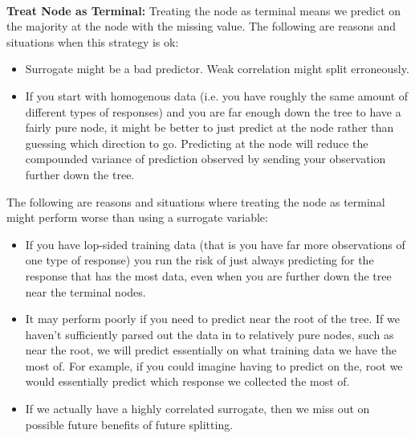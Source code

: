 \documentclass[11pt]{article}
\begin{document}
\begin{center}

\ \\
\end{center}


\vspace{5 mm}
\noindent
{\bf Treat Node as Terminal:} Treating the node as terminal means we predict on 
the majority at the node with the missing value. The following are reasons and 
situations when this strategy is ok:

\begin{itemize}
\item Surrogate might be a bad predictor. Weak correlation might split 
erroneously.
\item If you start with homogenous data (i.e. you have roughly the same amount 
of different types of responses) and you are far enough down the tree to have a 
fairly pure node, it might be better to just predict at the node rather than 
guessing which direction to go. Predicting at the node will reduce the 
compounded variance of prediction observed by sending your observation further 
down the tree.
\end{itemize}

\vspace{2 mm}
\noindent
The following are reasons and situations where treating the node as terminal 
might perform worse than using a surrogate variable:

\begin{itemize}
\item If you have lop-sided training data (that is you have far more 
observations of one type of response) you run the risk of just always 
predicting for the response that has the most data, even when you are further 
down the tree near the terminal nodes.
\item It may perform poorly if you need to predict near the root of the tree. 
If we haven't sufficiently parsed out the data in to relatively pure nodes, 
such as near the root, we will predict essentially on what training data we 
have the most of. For example, if you could imagine having to predict on the, 
root we would essentially predict which response we collected the most of.
\item If we actually have a highly correlated surrogate, then we miss out on 
possible future benefits of future splitting.
\end{itemize}
\end{document}
